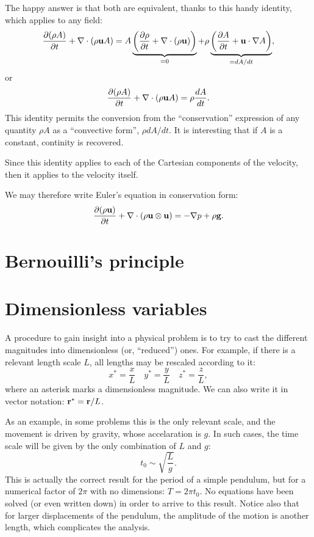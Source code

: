 The happy answer is that both are equivalent, thanks to this handy
identity, which applies to any field:
\[
\frac{\partial ( \rho  A ) }{\partial t} +
\nabla  \cdot ( \rho \bfu A) =
%
A
\underbrace{
\left(
\frac{\partial \rho }{\partial t} +
\nabla  \cdot ( \rho \bfu ) 
\right)}_{=0}  +
\rho 
\underbrace{
\left(
\frac{\partial A }{\partial t} +
\bfu \cdot \nabla  A
\right) }_{=dA/dt}  ,
\]
or
\begin{equation}
  \label{eq:conserv_to_total}
  \frac{\partial ( \rho  A ) }{\partial t} +
  \nabla  \cdot ( \rho \mathbf{u} A) =
  \rho \frac{d  A }{d t} .
\end{equation}
This identity permits the conversion from the ``conservation''
expression of any quantity $\rho A$ as a ``convective form'', $\rho
dA/dt$. It is interesting that if $A$ is a constant, continity is
recovered.

Since this identity applies to each of the Cartesian components of the
velocity, then it applies to the velocity itself.

We may therefore write Euler's equation in conservation form:
\[
\frac{\partial  (\rho \mathbf{u} ) }{\partial t} +
 \nabla \cdot ( \rho \mathbf{u} \otimes \mathbf{u} ) =
 - \nabla p 
 + \rho \mathbf{g} .
\]


\section{Bernouilli's principle}




\section{Dimensionless variables}
\label{sec:Euler_adim}

A procedure to gain insight into a physical problem is to try to cast
the different magnitudes into dimensionless (or, ``reduced'')
ones. For example, if there is a relevant length scale $L$, all
lengths may be rescaled according to it:
\[
x^*=\frac{x}{L} \quad
y^*=\frac{y}{L} \quad
z^*=\frac{z}{L} ,
\]
where an asterisk marks a dimensionless magnitude. We can also write
it in vector notation: $\mathbf{r}^* = \mathbf{r} / L$.

As an example, in some problems this is the only relevant scale, and
the movement is driven by gravity, whose accelaration is $g$. In such
cases, the time scale will be given by the only combination of $L$ and
$g$:
\[
t_0 \sim \sqrt{\frac{ L }{ g }} .
\]
This is actually the correct result for the period of a simple
pendulum, but for a numerical factor of $2\pi$ with no dimensions:
$T=2\pi t_0$. No equations have been solved (or even written down) in
order to arrive to this result. Notice also that for larger
displacements of the pendulum, the amplitude of the motion is another
length, which complicates the analysis.


